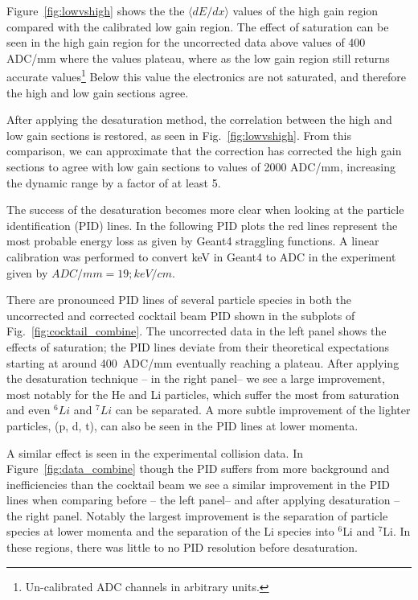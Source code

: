 Figure~\ref{fig:lowvshigh} shows the the $\langle dE/dx\rangle$ values of the high gain region compared with the calibrated low gain region. The effect of saturation can be seen in the high gain region for the uncorrected data above values of 400 ADC/mm where the values plateau, where as the low gain region still returns accurate values\footnote{Un-calibrated ADC channels in arbitrary units.} Below this value the electronics are not saturated, and therefore the high and low gain sections agree. 

 After applying the desaturation method, the correlation between the high and low gain sections is restored, as seen in Fig.~\ref{fig:lowvshigh}. From this comparison, we can approximate that the correction has corrected the high gain sections to agree with low gain sections to values of 2000 ADC/mm, increasing the dynamic range by a factor of at least 5.

The success of the desaturation becomes more clear when looking at the particle identification (PID) lines. In the following PID plots the red lines represent the most probable energy loss as given by Geant4 straggling functions. A linear calibration was performed to convert keV in Geant4 to ADC in the experiment given by $ADC/mm = 19;keV/cm$.

There are pronounced PID lines of several particle species in both the uncorrected and corrected cocktail beam PID shown in the subplots of Fig.~\ref{fig:cocktail_combine}. The uncorrected data in the left panel shows the effects of saturation; the PID lines deviate from their theoretical expectations starting at around 400~ADC/mm eventually reaching a plateau. After applying the desaturation technique -- in the right panel-- we see a large improvement, most notably for the He and Li particles, which suffer the most from saturation and even ${}^{6}Li$ and ${}^{7}Li$ can be separated. A more subtle improvement of the lighter particles, (p, d, t), can also be seen in the PID lines at lower momenta.

A similar effect is seen in the experimental collision data. In Figure~\ref{fig:data_combine} though the PID suffers from more background and inefficiencies than the cocktail beam we see a similar improvement in the PID lines when comparing before -- the left panel-- and after applying desaturation -- the right panel. Notably the largest improvement is the separation of particle species at lower momenta and the separation of the Li species into ${}^{6}$Li and ${}^{7}$Li. In these regions, there was little to no PID resolution before desaturation. 


